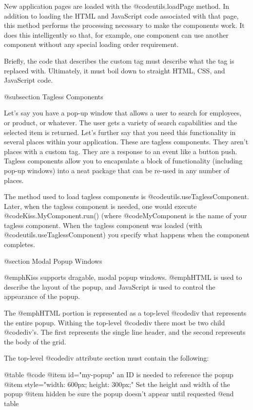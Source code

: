 New application pages are loaded with the @code{utils.loadPage}
method.  In addition to loading the HTML and JavaScript code
associated with that page, this method performs the processing
necessary to make the components work.  It does this intelligently so
that, for example, one component can use another component without any
special loading order requirement.

Briefly, the code that describes the custom tag must describe what the
tag is replaced with.  Ultimately, it must boil down to straight HTML,
CSS, and JavaScript code.


@subsection Tagless Components

Let's say you have a pop-up window that allows a user to search for employees, or product, or whatever.
The user gets a variety of search capabilities and the selected item is returned. Let's further say
that you need this functionality in several places within your application.  These are tagless
components.  They aren't places with a custom tag.  They are a response to an event like a button push.
Tagless components allow you to encapsulate a block of functionality (including pop-up windows) into
a neat package that can be re-used in any number of places.

The method used to load tagless components is
@code{utils.useTaglessComponent}.  Later, when the tagless component
is needed, one would execute @code{Kiss.MyComponent.run()} (where
@code{MyComponent} is the name of your tagless component.  When the
tagless component was loaded (with @code{utils.useTaglessComponent})
you specify what happens when the component completes.

@section Modal Popup Windows

@emph{Kiss} supports dragable, modal popup windows. @emph{HTML} is used to describe the layout of the popup, and JavaScript is used
to control the appearance of the popup.

The @emph{HTML} portion is represented as a top-level @code{div} that represents the entire popup.  Withing the top-level
@code{div} there most be two child @code{div}'s.  The first represents the single line header, and the second represents
the body of the grid.

The top-level @code{div} attribute section must contain the following:

@table @code
@item id="my-popup"
an ID is needed to reference the popup
@item style="width: 600px; height: 300px;"
Set the height and width of the popup
@item hidden
be sure the popup doesn't appear until requested
@end table

